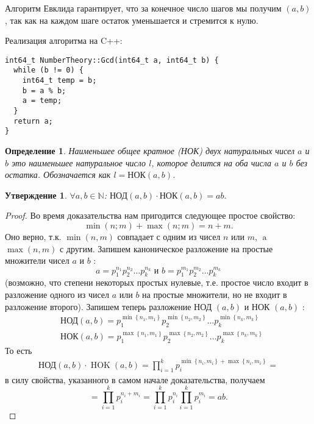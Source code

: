 \documentclass[12pt, a4paper, openany]{book}
\newtheorem*{definition}{Определение}
\newtheorem*{statement}{Утверждение}
\begin{document}
Алгоритм Евклида гарантирует, что за конечное число шагов мы получим $(a, b)$, так как на каждом шаге остаток уменьшается и стремится к нулю.

\newpage

\noindent
Реализация алгоритма на C++:

\begin{lstlisting}
int64_t NumberTheory::Gcd(int64_t a, int64_t b) {
  while (b != 0) {
    int64_t temp = b;
    b = a % b;
    a = temp;
  }
  return a;
}
\end{lstlisting}

\begin{definition}
Наименьшее общее кратное (НОК) двух натуральных чисел \(a\) и \(b\) это наименьшее натуральное число \(l\), которое делится на оба числа \(a\) и \(b\) без остатка. Обозначается как \(l = \text{НОК}(a, b)\).
\end{definition}

\begin{statement}
$\forall a, b \in \mathbb{N}$:
$\text{НОД}(a, b) \cdot \text{НОК}(a, b) = ab.$
\end{statement}
\begin{proof}
\noindent
Во время доказательства нам пригодится следующее простое свойство:
$$
\min (n ; m)+\max (n ; m)=n+m .
$$
\noindent
Оно верно, т.к. $\min (n, m)$ совпадает с одним из чисел $n$ или $m$, $\operatorname{a }$ $\max (n, m)$ с другим.
Запишем каноническое разложение на простые множители чисел $a$ и $b$ :
$$
a=p_1^{n_1} p_2^{n_2} \ldots p_k^{n_k} \text { и } b=p_1^{m_1} p_2^{m_2} \ldots p_k^{m_k}
$$
(возможно, что степени некоторых простых нулевые, т.е. простое число входит в разложение одного из чисел $a$ или $b$ на простые множители, но не входит в разложение второго). Запишем теперь разложение НОД $(a, b)$ и НОК $(a, b)$ :
$$
\begin{aligned}
& \text {НОД}(a, b)=p_1^{\min \left\{n_1, m_1\right\}} p_2^{\min \left\{n_2, m_2\right\}} \ldots p_k^{\min \left\{n_k, m_k\right\}} \\
& \text {НОК}(a, b)=p_1^{\max \left\{n_1, m_1\right\}} p_2^{\max \left\{n_2, m_2\right\}} \ldots p_k^{\max \left\{n_k, m_k\right\}}
\end{aligned}
$$
\noindent
То есть
$$
\begin{gathered}
\text {НОД}(a, b) \cdot \operatorname{HOK}(a, b)=\prod_{i=1}^k p_i^{\min \left\{n_i, m_i\right\}+\max \left\{n_i, m_i\right\}}=
\end{gathered}
$$
\noindent
в силу свойства, указанного в самом начале доказательства, получаем
$$
=\prod_{i=1}^k p_i^{n_i + m_i}=\prod_{i=1}^k p_i^{n_i}\prod_{i=1}^k p_i^{m_i}=a b .
$$
\end{proof}
\end{document}
